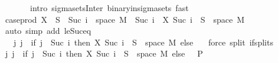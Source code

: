 \begin{isabellebody}
\ \ \ \ \ \ \ {\isacharparenleft}{\kern0pt}intro\ sigma{\isacharunderscore}{\kern0pt}sets{\isacharunderscore}{\kern0pt}Inter\ binary{\isacharunderscore}{\kern0pt}in{\isacharunderscore}{\kern0pt}sigma{\isacharunderscore}{\kern0pt}sets{\isacharcomma}{\kern0pt}\ fast{\isacharparenright}{\kern0pt}{\isacharplus}{\kern0pt}\isanewline
\ \ \isamarkupfalse%
\ \isamarkupfalse%
\ {\isachardoublequoteopen}case{\isacharunderscore}{\kern0pt}prod\ X\ {\isacharminus}{\kern0pt}{\isacharbackquote}{\kern0pt}\ S\ {\isasyminter}\ {\isacharparenleft}{\kern0pt}{\isacharbraceleft}{\kern0pt}Suc\ i{\isacharbraceright}{\kern0pt}\ {\isasymtimes}\ space\ M{\isacharparenright}{\kern0pt}\ {\isacharequal}{\kern0pt}\ {\isacharbraceleft}{\kern0pt}Suc\ i{\isacharbraceright}{\kern0pt}\ {\isasymtimes}\ {\isacharparenleft}{\kern0pt}X\ {\isacharparenleft}{\kern0pt}Suc\ i{\isacharparenright}{\kern0pt}\ {\isacharminus}{\kern0pt}{\isacharbackquote}{\kern0pt}\ S\ {\isasyminter}\ space\ M{\isacharparenright}{\kern0pt}{\isachardoublequoteclose}\ \isamarkupfalse%
\ {\isacharparenleft}{\kern0pt}auto\ simp\ add{\isacharcolon}{\kern0pt}\ le{\isacharunderscore}{\kern0pt}Suc{\isacharunderscore}{\kern0pt}eq{\isacharparenright}{\kern0pt}\isanewline
\ \ \isamarkupfalse%
\ \isamarkupfalse%
\ {\isachardoublequoteopen}{\isachardot}{\kern0pt}{\isachardot}{\kern0pt}{\isachardot}{\kern0pt}\ {\isacharequal}{\kern0pt}\ {\isacharparenleft}{\kern0pt}{\isasymUnion}j{\isachardot}{\kern0pt}\ {\isacharbraceleft}{\kern0pt}j{\isacharbraceright}{\kern0pt}\ {\isasymtimes}\ {\isacharparenleft}{\kern0pt}if\ j\ {\isacharequal}{\kern0pt}\ Suc\ i\ then\ {\isacharparenleft}{\kern0pt}X\ {\isacharparenleft}{\kern0pt}Suc\ i{\isacharparenright}{\kern0pt}\ {\isacharminus}{\kern0pt}{\isacharbackquote}{\kern0pt}\ S\ {\isasyminter}\ space\ M{\isacharparenright}{\kern0pt}\ else\ {\isacharbraceleft}{\kern0pt}{\isacharbraceright}{\kern0pt}{\isacharparenright}{\kern0pt}{\isacharparenright}{\kern0pt}{\isachardoublequoteclose}\ \isamarkupfalse%
\ {\isacharparenleft}{\kern0pt}force\ split{\isacharcolon}{\kern0pt}\ if{\isacharunderscore}{\kern0pt}splits{\isacharparenright}{\kern0pt}\isanewline
\ \ \isamarkupfalse%
\ \isamarkupfalse%
\ {\isachardoublequoteopen}{\isacharparenleft}{\kern0pt}{\isasymUnion}j{\isachardot}{\kern0pt}\ {\isacharbraceleft}{\kern0pt}j{\isacharbraceright}{\kern0pt}\ {\isasymtimes}\ {\isacharparenleft}{\kern0pt}if\ j\ {\isacharequal}{\kern0pt}\ Suc\ i\ then\ {\isacharparenleft}{\kern0pt}X\ {\isacharparenleft}{\kern0pt}Suc\ i{\isacharparenright}{\kern0pt}\ {\isacharminus}{\kern0pt}{\isacharbackquote}{\kern0pt}\ S\ {\isasyminter}\ space\ M{\isacharparenright}{\kern0pt}\ else\ {\isacharbraceleft}{\kern0pt}{\isacharbraceright}{\kern0pt}{\isacharparenright}{\kern0pt}{\isacharparenright}{\kern0pt}\ {\isasymin}\ {\isasymSigma}\isactrlsub P{\isachardoublequoteclose}\ \isamarkupfalse%

\end{isabellebody}
